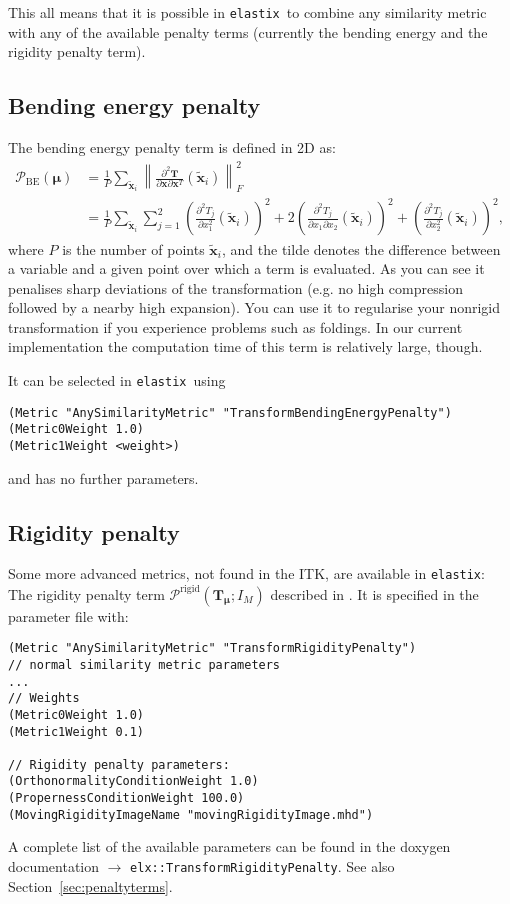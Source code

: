 \documentclass[]{report}
\newcommand{\elastix}{\texttt{elastix}}
\newcommand{\vx}{\bm{x}}
\newcommand{\vxt}[1][]{\bm{\widetilde x}_{#1}}
\newcommand{\vmu}{\bm{\mu}}
\newcommand{\vT}{\bm{T}}
\newcommand{\vTm}{\bm{T}_{\vmu}}
\begin{document}
This all means that it is possible in \elastix\ to combine any similarity
metric with any of the available penalty terms (currently the bending energy
and the rigidity penalty term).

\subsection{Bending energy penalty}\label{sec:advanced:be}

The bending energy penalty term is defined in 2D as:
\begin{align}
\mathcal{P}_{\mathrm{BE}}(\vmu) &= \frac{1}{P} \sum_{\vxt[i]}
\left\| \frac{\partial^2 \vT}{\partial \vx \partial \vx^T}(\vxt[i])
\right\|_F^2 \\
&= \frac{1}{P} \sum_{\vxt[i]} \sum_{j = 1}^2 \left( \frac{\partial^2
T_j}{\partial x_1^2}(\vxt[i]) \right)^2  + 2 \left( \frac{\partial^2
T_j}{\partial x_1 \partial x_2}(\vxt[i]) \right)^2 + \left(
\frac{\partial^2 T_j}{\partial x_2^2}(\vxt[i]) \right)^2,
\end{align}
where $P$ is the number of points $\vxt[i]$, and the tilde denotes the
difference between a variable and a given point over which a term is evaluated.
As you can see it penalises sharp deviations of the transformation (e.g. no
high compression followed by a nearby high expansion). You can use it to
regularise your nonrigid transformation if you experience problems such as
foldings. In our current implementation the computation time of this term is
relatively large, though.

It can be selected in \elastix\ using \small
\begin{verbatim}
(Metric "AnySimilarityMetric" "TransformBendingEnergyPenalty")
(Metric0Weight 1.0)
(Metric1Weight <weight>)
\end{verbatim}
\normalsize and has no further parameters.

\subsection{Rigidity penalty}\label{sec:advanced:rp}

Some more advanced metrics, not found in the ITK, are available in
\elastix: The rigidity penalty term
$\mathcal{P}^{\mathrm{rigid}}(\vTm;I_M)$ described in
\cite{Staring07}. It is specified in the parameter file with: \small
\begin{verbatim}
(Metric "AnySimilarityMetric" "TransformRigidityPenalty")
// normal similarity metric parameters
...
// Weights
(Metric0Weight 1.0)
(Metric1Weight 0.1)

// Rigidity penalty parameters:
(OrthonormalityConditionWeight 1.0)
(PropernessConditionWeight 100.0)
(MovingRigidityImageName "movingRigidityImage.mhd")
\end{verbatim}
\normalsize A complete list of the available parameters can be found in the
doxygen documentation $\rightarrow$ \linebreak
\texttt{elx::TransformRigidityPenalty}. See also
Section~\ref{sec:penaltyterms}.
\end{document}
